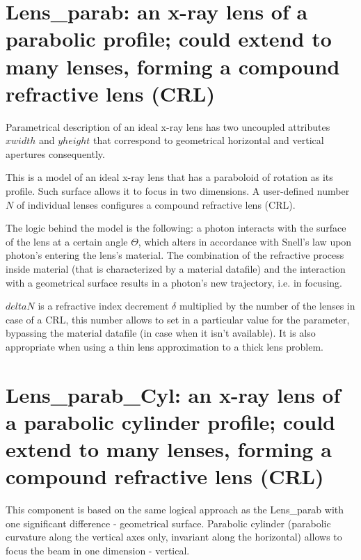 \section{Lens\_parab: an x-ray lens of a parabolic profile; could extend to many lenses, forming a compound refractive lens (CRL)}
\label{lens-parab}

Parametrical description of an ideal x-ray lens has two uncoupled attributes $xwidth$ and $yheight$ that correspond to geometrical horizontal and vertical apertures consequently.

This is a model of an ideal x-ray lens that has a paraboloid of rotation as its profile. Such surface allows it to focus in two dimensions. A user-defined number $N$ of individual lenses configures a compound refractive lens (CRL).

The logic behind the model is the following: a photon interacts with the surface of the lens at a certain angle $\Theta$, which alters in accordance with Snell's law upon photon's entering the lens's material. The combination of the refractive process inside material (that is characterized by a material datafile) and the interaction with a geometrical surface results in a photon's new trajectory, i.e. in focusing.

$deltaN$ is a refractive index decrement $\delta$ multiplied by the number of the lenses in case of a CRL, this number allows to set in a particular value for the parameter, bypassing the material datafile (in case when it isn't available). It is also appropriate when using a thin lens approximation to a thick lens problem.  
  
\section{Lens\_parab\_Cyl: an x-ray lens of a parabolic cylinder profile; could extend to many lenses, forming a compound refractive lens (CRL)}
\label{lens-parab-cyl}


This component is based on the same logical approach as the {Lens\_parab} with one significant difference - geometrical surface. Parabolic cylinder (parabolic curvature along the vertical axes only, invariant along the horizontal) allows to focus the beam in one dimension - vertical.
